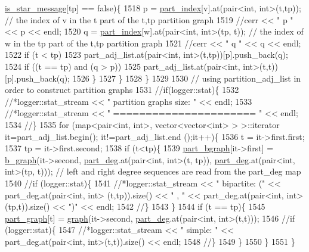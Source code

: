 \begin{DoxyCode}
      \hyperlink{classgraph__message_a55ff5531a0043106369e84a7bc45e22d}{is\_star\_message}[tp] == \textcolor{keyword}{false})\{
1518         p = \hyperlink{classmarked__graph__encoder_a1d3e2b90f5d46244fd4cb33c69ac81f1}{part\_index}[v].at(pair<int, int>(t,tp)); \textcolor{comment}{// the index of v in the t part of the t,tp
       partition graph}
1519         \textcolor{comment}{//cerr << " p " << p << endl;}
1520         q = \hyperlink{classmarked__graph__encoder_a1d3e2b90f5d46244fd4cb33c69ac81f1}{part\_index}[w].at(pair<int, int>(tp, t)); \textcolor{comment}{// the index of w in the tp part of the t,tp
       partition graph}
1521         \textcolor{comment}{//cerr << " q " << q << endl;}
1522         \textcolor{keywordflow}{if} (t < tp)
1523           part\_adj\_list.at(pair<int, int>(t,tp))[p].push\_back(q);
1524         \textcolor{keywordflow}{if} ((t == tp) and (q > p))
1525           part\_adj\_list.at(pair<int, int>(t,t))[p].push\_back(q);
1526       \}
1527     \}
1528   \}
1529 
1530   \textcolor{comment}{// using partition\_adj\_list in order to construct partition graphs}
1531   \textcolor{comment}{//if(logger::stat)\{}
1532   \textcolor{comment}{//*logger::stat\_stream << " partition graphs size: " << endl;}
1533   \textcolor{comment}{//*logger::stat\_stream << " ====================== " << endl;}
1534   \textcolor{comment}{//\}}
1535   \textcolor{keywordflow}{for} (map<pair<int, int>, vector<vector<int> > >::iterator it=part\_adj\_list.begin(); it!=part\_adj\_list.end
      ();it++)\{
1536     t = it->first.first;
1537     tp = it->first.second;
1538     \textcolor{keywordflow}{if} (t<tp)\{
1539       \hyperlink{classmarked__graph__encoder_a5faebef707fb681c0b6c2ccf64abc04c}{part\_bgraph}[it->first] = \hyperlink{classb__graph}{b\_graph}(it->second, \hyperlink{classmarked__graph__encoder_a55ea2edb2609dfc287432f61900d6ad1}{part\_deg}.at(pair<int, int>(t,
      tp)), \hyperlink{classmarked__graph__encoder_a55ea2edb2609dfc287432f61900d6ad1}{part\_deg}.at(pair<int, int>(tp, t))); \textcolor{comment}{// left and right degree sequences are read from the
       part\_deg map}
1540       \textcolor{comment}{//if (logger::stat)\{}
1541       \textcolor{comment}{//*logger::stat\_stream << " bipartite: (" << part\_deg.at(pair<int, int> (t,tp)).size() << " , " <<
       part\_deg.at(pair<int, int>(tp,t)).size() << ")" << endl;}
1542       \textcolor{comment}{//\}}
1543     \}
1544     \textcolor{keywordflow}{if} (t == tp)\{
1545       \hyperlink{classmarked__graph__encoder_adbafd0769ae301acc1b2c19b5e1d4844}{part\_graph}[t] = \hyperlink{classgraph}{graph}(it->second, \hyperlink{classmarked__graph__encoder_a55ea2edb2609dfc287432f61900d6ad1}{part\_deg}.at(pair<int, int>(t,t)));
1546       \textcolor{comment}{//if (logger::stat)\{}
1547       \textcolor{comment}{//*logger::stat\_stream << " simple: "  << part\_deg.at(pair<int, int>(t,t)).size() << endl;}
1548       \textcolor{comment}{//\}}
1549     \}
1550   \}
1551 \}
\end{DoxyCode}
